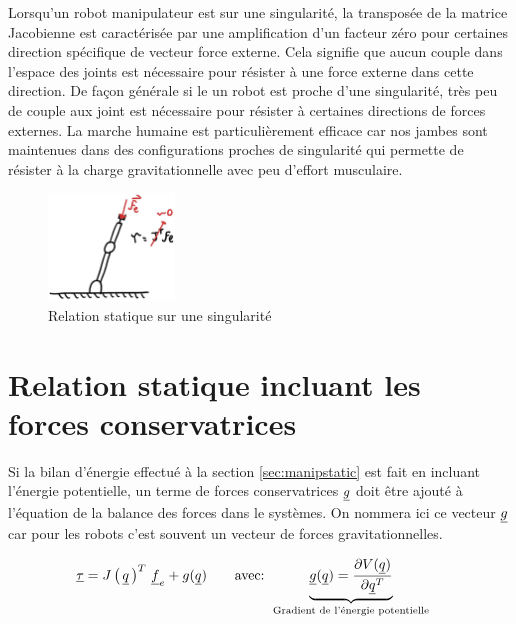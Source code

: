 Lorsqu'un robot manipulateur est sur une singularité, la transposée de la matrice Jacobienne est caractérisée par une amplification d'un facteur zéro pour certaines direction spécifique de vecteur force externe. Cela signifie que aucun couple dans l'espace des joints est nécessaire pour résister à une force externe dans cette direction. De façon générale si le un robot est proche d'une singularité, très peu de couple aux joint est nécessaire pour résister à certaines directions de forces externes. La marche humaine est particulièrement efficace car nos jambes sont maintenues dans des configurations proches de singularité qui permette de résister à la charge gravitationnelle avec peu d'effort musculaire. 
\begin{figure}[H]
	\centering
		\includegraphics[width=0.30\textwidth]{fig/externalforcesingularity.jpg}
	\caption{Relation statique sur une singularité}
	\label{fig:externalforcesingularity}
\end{figure}


\section{Relation statique incluant les forces conservatrices}
\label{sec:manipstaticconservative}

Si la bilan d'énergie effectué à la section \ref{sec:manipstatic} est fait en incluant l'énergie potentielle, un terme de forces conservatrices $\underline{g}$ doit être ajouté à l'équation de la balance des forces dans le systèmes. On nommera ici ce vecteur $\underline{g}$ car pour les robots c'est souvent un vecteur de forces gravitationnelles. 

\begin{align}
\underline{\tau} &= J\left( \, \underline{q} \, \right)^T \, \underline{f}_e +  g( \underline{q} )
\quad \quad \text{avec:  }
\underbrace{ \underline{g} ( \underline{q} ) = 
\frac{ \partial V(\underline{q} ) }{\partial \underline{q}^T } 
}_{\text{Gradient de l'énergie potentielle}}
\label{eq:staticgravity}
\end{align}



